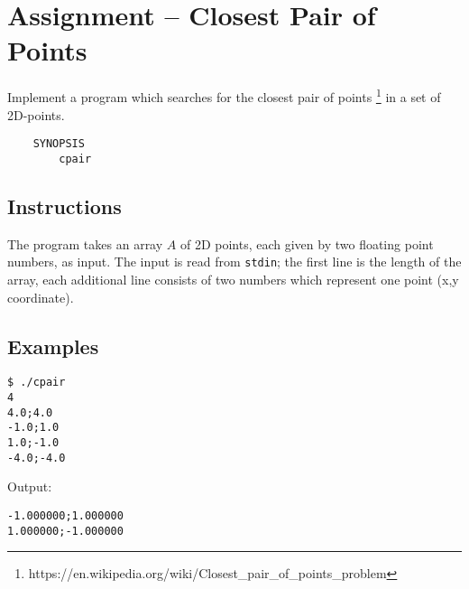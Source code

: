
\usepackage{amsmath}



\section*{ Assignment -- Closest Pair of Points}
Implement a program which searches for the closest pair of points \footnote{https://en.wikipedia.org/wiki/Closest\_pair\_of\_points\_problem} in a set of 2D-points.
\begin{verbatim}
    SYNOPSIS
        cpair
\end{verbatim}

\subsection*{Instructions}
The program takes an array $A$ of 2D points, each given by two floating point numbers, as input.
The input is read from \texttt{stdin}; the first line is the length of the array,
each additional line consists of two numbers which represent one point (x,y coordinate).
\subsection*{Examples}
\begin{verbatim}
$ ./cpair
4
4.0;4.0
-1.0;1.0
1.0;-1.0
-4.0;-4.0
\end{verbatim}
Output: 
\begin{verbatim}
-1.000000;1.000000
1.000000;-1.000000
\end{verbatim}
